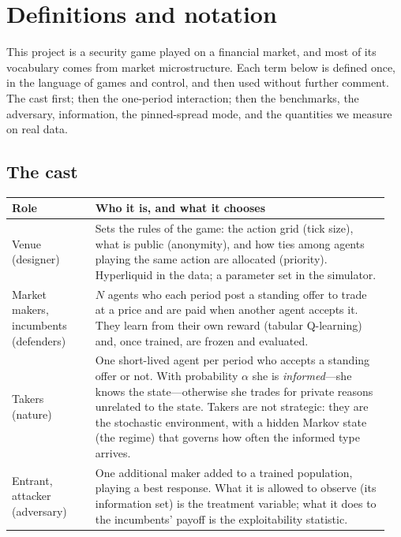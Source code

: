 \section{Definitions and notation}\label{sec:defs}

This project is a security game played on a financial market, and most of its vocabulary comes
from market microstructure. Each term below is defined once, in the language of games and
control, and then used without further comment. The cast first; then the one-period interaction;
then the benchmarks, the adversary, information, the pinned-spread mode, and the quantities we
measure on real data.

\subsection*{The cast}
\begin{center}\small
\begin{tabular}{p{0.21\linewidth}p{0.74\linewidth}}
\toprule
\textbf{Role} & \textbf{Who it is, and what it chooses} \\
\midrule
Venue (designer) & Sets the rules of the game: the action grid (tick size), what is public (anonymity), and how ties among agents playing the same action are allocated (priority). Hyperliquid in the data; a parameter set in the simulator. \\
\addlinespace
Market makers, incumbents (defenders) & $N$ agents who each period post a standing offer to trade at a price and are paid when another agent accepts it. They learn from their own reward (tabular Q-learning) and, once trained, are frozen and evaluated. \\
\addlinespace
Takers (nature) & One short-lived agent per period who accepts a standing offer or not. With probability $\alpha$ she is \emph{informed}---she knows the state---otherwise she trades for private reasons unrelated to the state. Takers are not strategic: they are the stochastic environment, with a hidden Markov state (the regime) that governs how often the informed type arrives. \\
\addlinespace
Entrant, attacker (adversary) & One additional maker added to a trained population, playing a best response. What it is allowed to observe (its information set) is the treatment variable; what it does to the incumbents' payoff is the exploitability statistic. \\
\bottomrule
\end{tabular}
\end{center}

